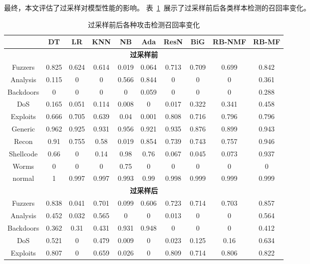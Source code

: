 最终，本文评估了过采样对模型性能的影响。
表~\ref{tab:model_performance_oversampling}~展示了过采样前后各类样本检测的召回率变化。
\begin{table}[htbp]
	\centering
	\caption{过采样前后各种攻击检测召回率变化}
	\label{tab:model_performance_oversampling}
	\begin{tabular}{cccccccccc}
		\toprule
		          & DT    & LR    & KNN   & NB    & Ada   & ResN  & BiG   & RB-NMF & RB-MF \\
		\midrule
		\multicolumn{10}{c}{\textbf{过采样前}}                                                 \\
		Fuzzers   & 0.825 & 0.624 & 0.614 & 0.019 & 0.064 & 0.713 & 0.709 & 0.699  & 0.842 \\
		Analysis  & 0.115 & 0     & 0     & 0.566 & 0.844 & 0     & 0     & 0      & 0.361 \\
		Backdoors & 0     & 0     & 0     & 0     & 0.059 & 0     & 0     & 0      & 0.288 \\
		DoS       & 0.165 & 0.051 & 0.114 & 0.008 & 0     & 0.017 & 0.322 & 0.341  & 0.458 \\
		Exploits  & 0.666 & 0.705 & 0.639 & 0.04  & 0.001 & 0.808 & 0.716 & 0.796  & 0.796 \\
		Generic   & 0.962 & 0.925 & 0.931 & 0.956 & 0.921 & 0.935 & 0.876 & 0.899  & 0.943 \\
		Recon     & 0.91  & 0.755 & 0.58  & 0.019 & 0.854 & 0.739 & 0.743 & 0.757  & 0.946 \\
		Shellcode & 0.66  & 0     & 0.14  & 0.98  & 0.76  & 0.067 & 0.045 & 0.073  & 0.937 \\
		Worms     & 0     & 0     & 0     & 0.75  & 0     & 0     & 0     & 0      & 0     \\
		normal    & 1     & 0.997 & 0.997 & 0.993 & 0.99  & 0.998 & 0.999 & 0.999  & 0.999 \\
		\midrule
		\multicolumn{10}{c}{\textbf{过采样后}}                                                 \\
		Fuzzers   & 0.838 & 0.041 & 0.701 & 0.099 & 0.606 & 0.723 & 0.714 & 0.703  & 0.857 \\
		Analysis  & 0.452 & 0.032 & 0.565 & 0     & 0     & 0.013 & 0     & 0      & 0.564 \\
		Backdoors & 0.362 & 0.31  & 0.431 & 0.931 & 0.948 & 0     & 0     & 0      & 0.412 \\
		DoS       & 0.521 & 0     & 0.479 & 0.009 & 0     & 0.023 & 0.125 & 0.16   & 0.634 \\
		Exploits  & 0.807 & 0     & 0.659 & 0.026 & 0     & 0.809 & 0.714 & 0.806  & 0.822 \\

\end{tabular}
\end{table}
